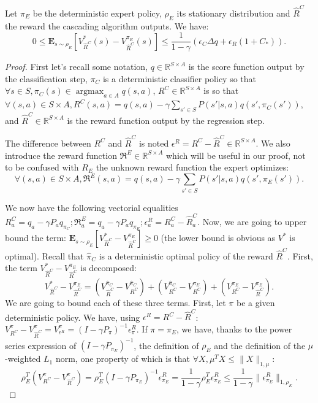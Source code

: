 \documentclass{llncs}
\newcommand{\E}{\mathbf{E}}
\newcommand{\argmax}{\operatorname*{argmax}} %
\begin{document}
\begin{theorem}
\label{thm}
Let $\pi_E$ be the deterministic expert policy, $\rho_E$ its stationary distribution and $\hat{R}^C$ the reward the cascading algorithm outputs. We have:
\begin{equation}
0\leq\E_{s\sim\rho_E}[V^*_{\hat{R}^C}(s)-V^{\pi_E}_{\hat{R}^C}(s)]\leq \frac{1}{1-\gamma}\left(\epsilon_C\Delta q +\epsilon_R(1+C_*)\right).
\end{equation}
\end{theorem}
\begin{proof}
First let's recall some notation, $q\in\mathbb{R}^{S\times A}$ is the score function output by the classification step, $\pi_C$ is a deterministic classifier policy so that $\forall s \in S,\pi_C(s)\in\argmax_{a\in A}q(s,a)$, $R^C\in\mathbb{R}^{S\times A}$ is so that $\forall (s,a)\in S\times A, R^C(s,a)=q(s,a) -\gamma\sum_{s'\in S}P(s'|s,a)q(s',\pi_C(s'))$,
and $\hat{R}^C\in\mathbb{R}^{S\times A}$ is the reward function output by the regression step.

The difference between $R^C$ and $\hat{R}^C$ is noted $\epsilon^R=R^C-\hat{R}^C\in\mathbb{R}^{S\times A}$.
We also introduce the reward function $\mathfrak{R}^E\in\mathbb{R}^{S\times A}$ which will be useful in our proof, not to be confused with $R_E$ the unknown reward function the expert optimizes:
\begin{equation}
\forall (s,a)\in S\times A, \mathfrak{R}^E(s,a)=q(s,a) -\gamma\sum_{s'\in S}P(s'|s,a)q(s',\pi_E(s')).
\end{equation}

We now have the following vectorial equalities $
R^C_a=q_a-\gamma P_aq_{\pi_C} ;
\mathfrak{R}^E_a=q_a-\gamma P_aq_{\pi_E};
\epsilon^R_a=R^C_a-\hat{R}^C_a$.
Now, we are going to upper bound the term: $\E_{s\sim\rho_E}[V^*_{\hat{R}^C}-V^{\pi_E}_{\hat{R}^C}]\geq0$ (the lower bound is obvious as $V^*$ is optimal).
Recall that $\hat{\pi}_C$ is a deterministic optimal policy of the reward $\hat{R}^C$. First, the term $V^*_{\hat{R}^C}-V^{\pi_E}_{\hat{R}^C}$ is decomposed:
\begin{equation}
V^*_{\hat{R}^C}-V^{\pi_E}_{\hat{R}^C}=(V^{\hat{\pi}_C}_{\hat{R}^C}-V^{\hat{\pi}_C}_{R^C})+(V^{\hat{\pi}_C}_{R^C}-V^{\pi_E}_{R^C})+(V^{\pi_E}_{R^C}-V^{\pi_E}_{\hat{R}^C}).
\end{equation}
We are going to bound each of these three terms. First, let $\pi$ be a given deterministic policy. We have, using $\epsilon^R = R^C - \hat R^C$:
$V^{\pi}_{R^C}-V^{\pi}_{\hat{R}^C}=V^{\pi}_{\epsilon^R}=(I-\gamma P_\pi)^{-1}\epsilon^R_{\pi}$.
If $\pi=\pi_E$, we have, thanks to the power series expression of $(I-\gamma P_{\pi_E})^{-1}$, the definition of $\rho_E$ and the definition of the $\mu$-weighted $L_1$ norm, one property of which is that $\forall X, \mu^TX \leq \|X\|_{1,\mu}$:
\begin{equation}
  \rho_E^T(V^{\pi}_{R^C}-V^{\pi}_{\hat{R}^C})=\rho_E^T(I-\gamma P_{\pi_E})^{-1}\epsilon^R_{\pi_E}=\frac{1}{1-\gamma}\rho_E^T\epsilon^R_{\pi_E}\leq\frac{1}{1-\gamma}\|\epsilon^R_{\pi_E}\|_{1,\rho_E}.\end{equation}


\end{proof}
\end{document}
